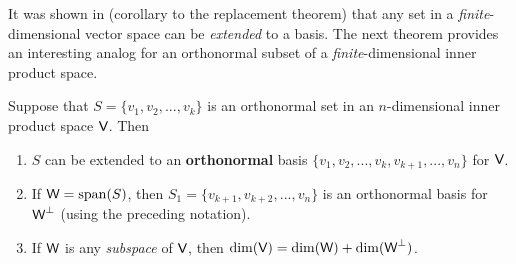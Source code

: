 \begin{remark} \label{remark 6.2.8}
It was shown in (corollary to the replacement theorem) that any \LID{} set in a \emph{finite}-dimensional vector space can be \emph{extended} to a basis.
The next theorem provides an interesting analog for an orthonormal subset of a \emph{finite}-dimensional inner product space.
\end{remark}

\begin{theorem} \label{thm 6.7}
Suppose that \(S = \{ v_1, v_2, ..., v_k \}\) is an orthonormal set in an \(n\)-dimensional inner product space \(\textsf{V}\).
Then
\begin{enumerate}
\item \(S\) can be extended to an \textbf{orthonormal} basis \(\{ v_1, v_2, ..., v_k, v_{k+1}, ..., v_n \}\) for \(\textsf{V}\).
\item If \(\textsf{W} = \operatorname{span}(S)\), then \(S_1 = \{v_{k+1}, v_{k+2}, ..., v_n \}\) is an orthonormal basis for \(\textsf{W}^{\perp}\) (using the preceding notation).
\item If \(\textsf{W}\) is any \emph{subspace} of \(\textsf{V}\), then \(\dim(\textsf{V}) = \dim(\textsf{W}) + \dim(\textsf{W}^{\perp})\).
\end{enumerate}
\end{theorem}

